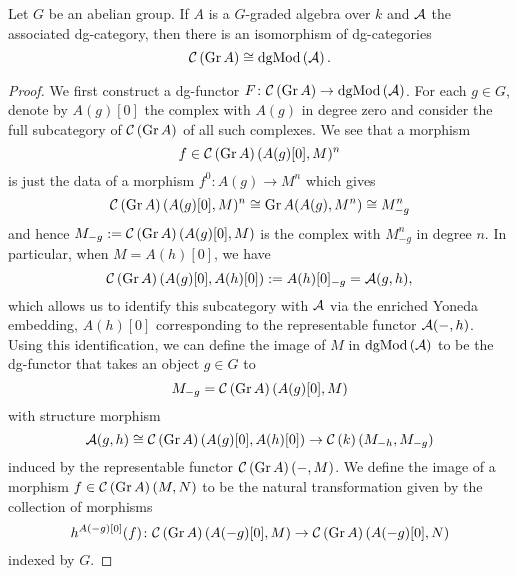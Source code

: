 \begin{lemma}\label{lem:GrModAsMod}
  Let \(G\) be an abelian group.
  If \(A\) is a \(G\)-graded algebra over \(k\) and \(\mathcal{A}\) the associated dg-category, then there is an isomorphism of dg-categories
  \[\mathcal{C}\left(\operatorname{Gr}A\right) \cong \operatorname{dgMod}\left(\mathcal{A}\right).\]

  \begin{proof}
    We first construct a dg-functor \(F \colon \mathcal{C}\left(\operatorname{Gr}A\right) \to \operatorname{dgMod}\left(\mathcal{A}\right)\).
    For each \(g \in G\), denote by \(A(g)[0]\) the complex with \(A(g)\) in degree zero and consider the full subcategory of \(\mathcal{C}\left(\operatorname{Gr}A\right)\) of all such complexes.
    We see that a morphism \[f \in \mathcal{C}\left(\operatorname{Gr}A\right)(A(g)[0],M)^n\] is just the data of a morphism \(f^0 \colon A(g) \to M^n\) which gives
    \[\mathcal{C}\left(\operatorname{Gr}A\right)(A(g)[0],M)^n \cong \operatorname{Gr}A(A(g), M^n) \cong M^n_{-g}\]
    and hence \(M_{-g} := \mathcal{C}\left(\operatorname{Gr}A\right)(A(g)[0], M)\) is the complex with \(M^n_{-g}\) in degree \(n\).
    In particular, when \(M = A(h)[0]\), we have
    \[\mathcal{C}\left(\operatorname{Gr}A\right)(A(g)[0],A(h)[0]) := A(h)[0]_{-g} = \mathcal{A}(g,h),\]
    which allows us to identify this subcategory with \(\mathcal{A}\) via the enriched Yoneda embedding, \(A(h)[0]\) corresponding to the representable functor \(\mathcal{A}(-,h)\).
    Using this identification, we can define the image of \(M\) in \(\operatorname{dgMod}\left(\mathcal{A}\right)\) to be the dg-functor that takes an object \(g \in G\) to
    \[M_{-g} = \mathcal{C}\left(\operatorname{Gr}A\right)(A(g)[0], M)\]
    with structure morphism
    \[\mathcal{A}(g,h) \cong \mathcal{C}\left(\operatorname{Gr}A\right)(A(g)[0], A(h)[0]) \to \mathcal{C}\left(k\right)(M_{-h}, M_{-g})\]
    induced by the representable functor \(\mathcal{C}\left(\operatorname{Gr}A\right)(-, M)\).
    We define the image of a morphism \(f \in \mathcal{C}\left(\operatorname{Gr}A\right)(M,N)\) to be the natural transformation given by the collection of morphisms
    \[h^{A(-g)[0]}(f) \colon \mathcal{C}\left(\operatorname{Gr}A\right)(A(-g)[0], M) \to \mathcal{C}\left(\operatorname{Gr}A\right)(A(-g)[0],N)\]
    indexed by \(G\).


\end{proof}
\end{lemma}
